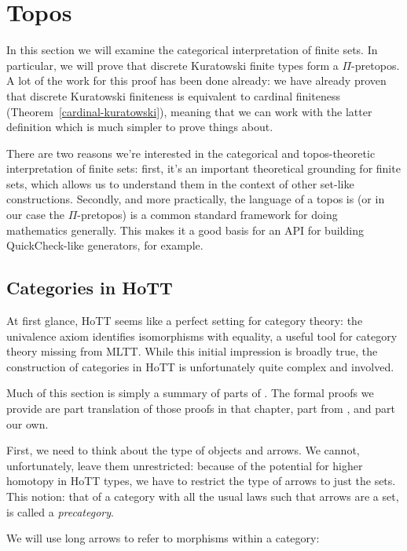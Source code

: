 \chapter{Topos} \label{topos}
In this section we will examine the categorical interpretation of finite sets.
In particular, we will prove that discrete Kuratowski finite types form a
\(\Pi\)-pretopos.
A lot of the work for this proof has been done already: we have already proven
that discrete Kuratowski finiteness is equivalent to cardinal finiteness
(Theorem~\ref{cardinal-kuratowski}), meaning that we can work with the latter
definition which is much simpler to prove things about.

There are two reasons we're interested in the categorical and topos-theoretic
interpretation of finite sets: first, it's an important theoretical grounding
for finite sets, which allows us to understand them in the context of other
set-like constructions.
Secondly, and more practically, the language of a topos is (or in our case the
\(\Pi\)-pretopos) is a common standard framework for doing mathematics
generally.
This makes it a good basis for an API for building QuickCheck-like generators,
for example.
\section{Categories in HoTT}
At first glance, HoTT seems like a perfect setting for category theory: the
univalence axiom identifies isomorphisms with equality, a useful tool for
category theory missing from MLTT.
While this initial impression is broadly true, the construction of categories in
HoTT is unfortunately quite complex and involved.

Much of this section is simply a summary of parts of \citet[chapter
9]{hottbook}.
The formal proofs we provide are part translation of those proofs in that
chapter, part from \citep{iversenFredefoxCat2018}
\citep{huProofrelevantCategoryTheory2020}, and part our own.

First, we need to think about the type of objects and arrows.
We cannot, unfortunately, leave them unrestricted: because of the potential for
higher homotopy in HoTT types, we have
to restrict the type of arrows to just the sets.
This notion: that of a category with all the usual laws such that arrows are a
set, is called a \emph{precategory}.
\begin{agdalisting}
\end{agdalisting}
We will use long arrows to refer to morphisms within a category:
\begin{agdalisting*}
\end{agdalisting*}

